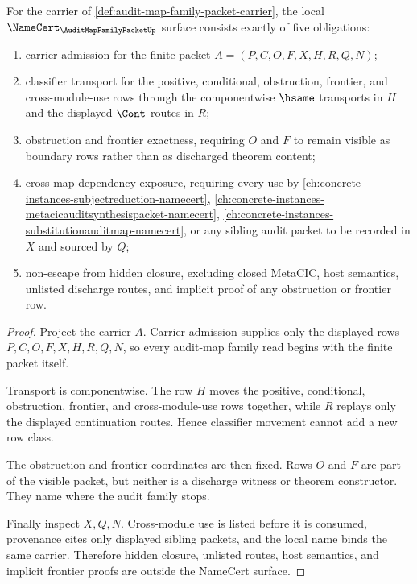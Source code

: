 \begin{theorem}
\label{thm:audit-map-family-packet-namecert-obligations}
For the carrier of \autoref{def:audit-map-family-packet-carrier}, the local $\NameCert_{\AuditMapFamilyPacketUp}$ surface consists exactly of five obligations:
\begin{enumerate}
\item carrier admission for the finite packet $A=(P,C,O,F,X,H,R,Q,N)$;
\item classifier transport for the positive, conditional, obstruction, frontier, and cross-module-use rows through the componentwise $\hsame$ transports in $H$ and the displayed $\Cont$ routes in $R$;
\item obstruction and frontier exactness, requiring $O$ and $F$ to remain visible as boundary rows rather than as discharged theorem content;
\item cross-map dependency exposure, requiring every use by \autoref{ch:concrete-instances-subjectreduction-namecert}, \autoref{ch:concrete-instances-metacicauditsynthesispacket-namecert}, \autoref{ch:concrete-instances-substitutionauditmap-namecert}, or any sibling audit packet to be recorded in $X$ and sourced by $Q$;
\item non-escape from hidden closure, excluding closed MetaCIC, host semantics, unlisted discharge routes, and implicit proof of any obstruction or frontier row.
\end{enumerate}
\end{theorem}
\begin{proof}
Project the carrier $A$. Carrier admission supplies only the displayed rows $P,C,O,F,X,H,R,Q,N$, so every audit-map family read begins with the finite packet itself.

Transport is componentwise. The row $H$ moves the positive, conditional, obstruction, frontier, and cross-module-use rows together, while $R$ replays only the displayed continuation routes. Hence classifier movement cannot add a new row class.

The obstruction and frontier coordinates are then fixed. Rows $O$ and $F$ are part of the visible packet, but neither is a discharge witness or theorem constructor. They name where the audit family stops.

Finally inspect $X,Q,N$. Cross-module use is listed before it is consumed, provenance cites only displayed sibling packets, and the local name binds the same carrier. Therefore hidden closure, unlisted routes, host semantics, and implicit frontier proofs are outside the NameCert surface.
\end{proof}

